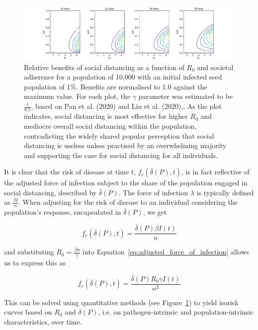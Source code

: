 \documentclass{article}
\begin{document}
\begin{figure}
	\includegraphics[width=\linewidth]{figures/fig3-risk-of-adherence}
	\caption{Relative benefits of social distancing as a function of $R_0$ and societal adherence for a population of 10,000 with an initial infected seed population of 1\%. Benefits are normalised to 1.0 against the maximum value. For each plot, the $\gamma$ parameter was estimated to be $\frac{1}{8.5}$, based on Pan et al. (2020) and Liu et al. (2020),\cite{pan2020clinical,liu2020risk}. As the plot indicates, social distancing is most effective for higher $R_0$ and mediocre overall social distancing within the population, contradicting the widely shared popular perception that social distancing is useless unless practised by an overwhelming majority and supporting the case for social distancing for all individuals.}
	\label{fig:risk_and_compliance}
\end{figure}


It is clear that the risk of disease at time $t$, $f_r(\bar{\delta}(P), t)$, is in fact reflective of the adjusted force of infection subject to the share of the population engaged in social distancing, described by $\bar{\delta}(P)$. The force of infection $\lambda$ is typically defined as $\frac{\beta I}{n}$. When adjusting for the risk of disease to an individual considering the population's response, encapsulated in $\bar{\delta}(P)$, we get

\begin{equation}
	f_r(\bar{\delta}(P), t) = \frac{\bar{\delta}(P) \beta I(t)}{n}
	\label{eq:adjusted_force_of_infection}
\end{equation}

\noindent and substituting $R_0 = \frac{\beta n}{\gamma}$ into Equation~\eqref{eq:adjusted_force_of_infection} allows us to express this as 

\begin{equation}
	f_r(\bar{\delta}(P), t) = \frac{\bar{\delta}(P) R_0 \gamma I(t)}{n^2}
	\label{eq:expanded_cost_fx}
\end{equation}

This can be solved using quantitative methods (see Figure~\ref{fig:risk_and_compliance}) to yield isorisk curves based on $R_0$ and $\delta(P)$, i.e. on pathogen-intrinsic and population-intrinsic characteristics, over time.
\end{document}
